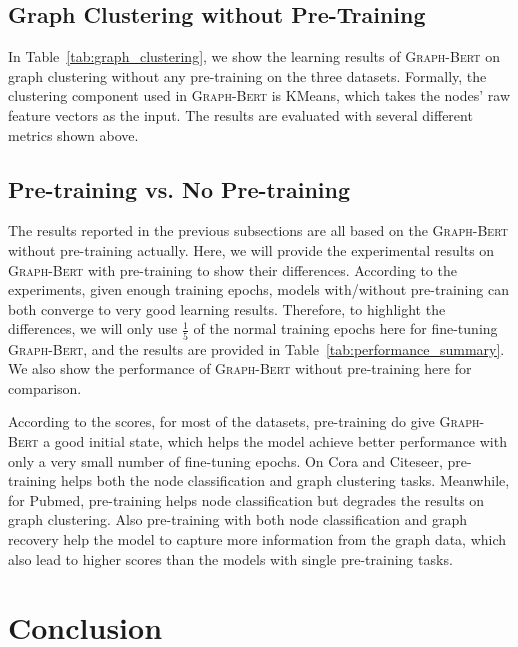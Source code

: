 \documentclass{article}
\newcommand{\our}{\textsc{Graph-Bert}}
\begin{document}
\subsection{Graph Clustering without Pre-Training}

In Table~\ref{tab:graph_clustering}, we show the learning results of {\our} on graph clustering without any pre-training on the three datasets. Formally, the clustering component used in {\our} is KMeans, which takes the nodes' raw feature vectors as the input. The results are evaluated with several different metrics shown above.

\subsection{Pre-training vs. No Pre-training}\label{subsec:pre_train_result}


The results reported in the previous subsections are all based on the {\our} without pre-training actually. Here, we will provide the experimental results on {\our} with pre-training to show their differences. According to the experiments, given enough training epochs, models with/without pre-training can both converge to very good learning results. Therefore, to highlight the differences, we will only use $\frac{1}{5}$ of the normal training epochs here for fine-tuning {\our}, and the results are provided in Table~\ref{tab:performance_summary}. We also show the performance of {\our} without pre-training here for comparison.

According to the scores, for most of the datasets, pre-training do give {\our} a good initial state, which helps the model achieve better performance with only a very small number of fine-tuning epochs. On Cora and Citeseer, pre-training helps both the node classification and graph clustering tasks. Meanwhile, for Pubmed, pre-training helps node classification but degrades the results on graph clustering. Also pre-training with both node classification and graph recovery help the model to capture more information from the graph data, which also lead to higher scores than the models with single pre-training tasks.

















\section{Conclusion}\label{sec:conclusion}
\end{document}
